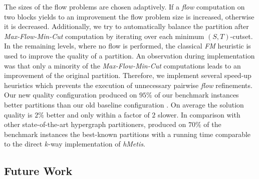 The sizes of the flow problems are chosen adaptively. If a \emph{flow} computation on two blocks
yields to an improvement the flow problem size is increased, otherwise it is decreased. 
Additionally, we try to automatically balance the partition after \emph{Max-Flow-Min-Cut}
computation by iterating over each minimum $(S,T)$-cutset. In the remaining levels, 
where no flow is performed, the classical \emph{FM} heuristic is used to improve the quality 
of a partition. An observation during implementation was that only a minority of 
the \emph{Max-Flow-Min-Cut} computations leads to an improvement of the original partition. 
Therefore, we implement several speed-up heuristics which prevents the
execution of unnecessary pairwise \emph{flow} refinements. \\
Our new quality configuration  produced on $95\%$ of our benchmark instances
better partitions than our old baseline configuration . On average the solution 
quality is $2\%$ better and only within a factor of $2$ slower. In comparison with other 
state-of-the-art hypergraph partitioners,  produced on $70\%$ of the benchmark instances
the best-known partitions with a running time comparable to the direct $k$-way implementation
of \emph{hMetis}.


\subsection{Future Work}

